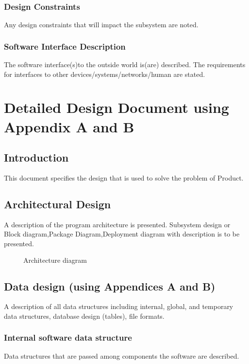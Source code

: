 \documentclass[oneside,a4paper,12pt]{report}
\begin{document}
 \subsection{Design Constraints}	
Any design constraints that will impact the subsystem are noted.
 \subsection{Software Interface Description}	 
The software interface(s)to the outside world is(are) described.
The requirements for interfaces to other devices/systems/networks/human are stated.



\chapter{Detailed Design Document using Appendix A and B}
 \section{Introduction}  
This document specifies the design that is used to solve the problem of Product.  
\section{Architectural Design}  
	A description of the program architecture is presented. Subsystem design or Block diagram,Package Diagram,Deployment diagram with description is to be presented.

 
  \begin{center}
	\begin{figure}[!htbp]
		\centering
	  \caption{Architecture diagram}
	  \label{fig:arch-dig}
	\end{figure}
\end{center} 


\section{Data design (using Appendices A and B)}   
A description of all data structures including internal, global, and temporary data structures, database design (tables), file formats.
\subsection{Internal software data structure}
Data structures that are passed among components the software are described.
\end{document}

